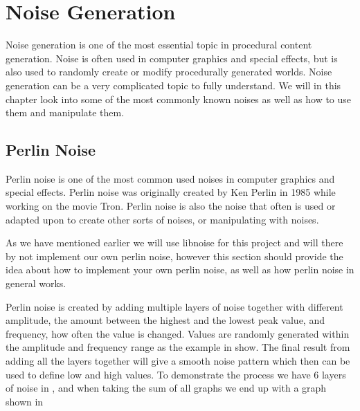 \chapter{Noise Generation}
\label{NoiseGen}
Noise generation is one of the most essential topic in procedural content generation. Noise is often used in computer graphics and special effects, but is also used to randomly create or modify procedurally generated worlds. Noise generation can be a very complicated topic to fully understand. We will in this chapter look into some of the most commonly known noises as well as how to use them and manipulate them.


\section{Perlin Noise}

Perlin noise is one of the most common used noises in computer graphics and special effects. Perlin noise was originally created by Ken Perlin\cite{KenPerlin} in 1985 while working on the movie Tron\cite{perlinnoise}. Perlin noise is also the noise that often is used or adapted upon to create other sorts of noises, or manipulating with noises.

As we have mentioned earlier we will use libnoise for this project and will there by not implement our own perlin noise, however this section should provide the idea about how to implement your own perlin noise, as well as how perlin noise in general works.

Perlin noise is created by adding multiple layers of noise together with different amplitude, the amount between the highest and the lowest peak value, and frequency, how often the value is changed\cite{perlinnoise2}. Values are randomly generated within the amplitude and frequency range as the example in  show. The final result from adding all the layers together will give a smooth noise pattern which then can be used to define low and high values\cite{NoiseMachineMakingNoise}. To demonstrate the process we have 6 layers of noise in , and when taking the sum of all graphs we end up with a graph shown in 

